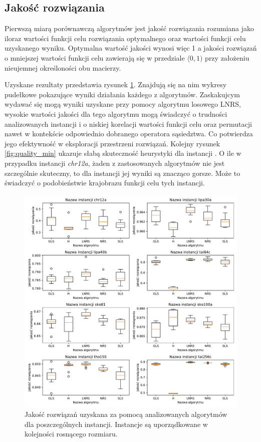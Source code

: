 \documentclass{article}
\begin{document}
\subsection{Jakość rozwiązania}
Pierwszą miarą porównawczą algorytmów jest jakość rozwiązania rozumiana jako iloraz wartości funkcji celu rozwiązania optymalnego oraz wartości funkcji celu uzyskanego wyniku. Optymalna wartość jakości wynosi więc 1 a jakości rozwiązań o mniejszej wartości funkcji celu zawierają się w przedziale $ \langle 0, 1 ) $ przy założeniu nieujemnej określoności obu macierzy.
\par Uzyskane rezultaty przedstawia rysunek \ref{fig:quality_mean}. Znajdują się na nim wykresy pudełkowe pokazujące wyniki działania każdego z algorytmów. Zaskakujcym wydawać się mogą wyniki uzyskane przy pomocy algorytmu losowego LNRS, wysokie wartości jakości dla tego algorytmu mogą świadczyć o trudności analizowanych instancji i o niskiej korelacji wartości funkcji celu oraz permutacji nawet w kontekście odpowiednio dobranego operatora sąsiedztwa. Co potwierdza jego efektywność w eksploracji przestrzeni rozwiązań. Kolejny rysunek \ref{fig:quality_min} ukazuje słabą skuteczność heurystyki dla instancji . O ile w przypadku instancji \textit{chr12a}, żaden z zastosowanych algorytmów nie jest szczególnie skuteczny, to dla instancji  jej wyniki są znacząco gorsze. Może to świadczyć o podobieństwie krajobrazu funkcji celu tych instancji.
\begin{figure}[H]
	\centering
	\includegraphics[width=\linewidth]{figs/quality_mean.pdf}
	\caption{Jakość rozwiązań uzyskana za pomocą analizowanych algorytmów dla poszczególnych instancji. Instancje są uporządkowane w kolejności rosnącego rozmiaru. }
	\label{fig:quality_mean}
\end{figure}
\end{document}
